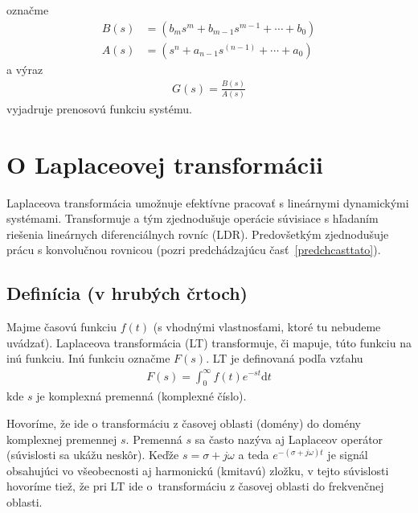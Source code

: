 \documentclass[a4paper, 10pt, ]{article}
\begin{document}
označme
\begin{subequations}
	\begin{align}
		B(s) &= \left( b_m   s^m + b_{m-1}   s^{m-1} + \cdots + b_0 \right) \\
		A(s) &=  \left( s^n + a_{n-1}   s^{(n-1)} + \cdots + a_0 \right)
	\end{align}
\end{subequations}
a výraz
\begin{align}
	G(s) = \frac{B(s)}{A(s)}
\end{align}
vyjadruje prenosovú funkciu systému.

























\section{O Laplaceovej transformácii}

Laplaceova transformácia umožnuje efektívne pracovať s lineárnymi dynamickými systémami. Transformuje a tým zjednodušuje operácie súvisiace s hľadaním riešenia lineárnych diferenciálnych rovníc (LDR). Predovšetkým zjednodušuje prácu s konvolučnou rovnicou (pozri predchádzajúcu časť~\ref{predchcasttato}).

\subsection{Definícia (v hrubých črtoch)}

Majme časovú funkciu $f(t)$ (s vhodnými vlastnosťami, ktoré tu nebudeme uvádzať). Laplaceova transformácia (LT) transformuje, či mapuje, túto funkciu na inú funkciu. Inú funkciu označme $F(s)$. LT je definovaná podľa vzťahu
\begin{align}
    F(s) = \int_0^\infty f(t) e^{-st}\text{d}t
\end{align}
kde $s$ je komplexná premenná (komplexné číslo).

Hovoríme, že ide o transformáciu z časovej oblasti (domény) do domény komplexnej premennej $s$. Premenná $s$ sa často nazýva aj Laplaceov operátor (súvislosti sa ukážu neskôr). Keďže $s = \sigma + j\omega$ a teda $e^{-(\sigma + j\omega)t}$ je signál obsahujúci vo všeobecnosti aj harmonickú (kmitavú) zložku, v tejto súvislosti hovoríme tiež, že pri LT ide o~transformáciu z časovej oblasti do frekvenčnej oblasti.
\end{document}

